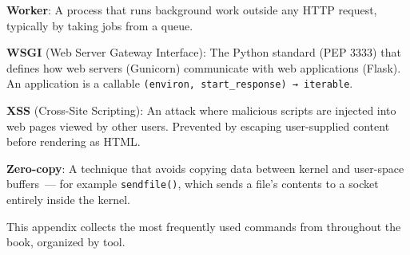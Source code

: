 \textbf{Worker}: A process that runs background work outside any HTTP request, typically by taking jobs from a queue.

\textbf{WSGI} (Web Server Gateway Interface): The Python standard (PEP 3333) that defines how web servers (Gunicorn) communicate with web applications (Flask). An application is a callable \texttt{(environ,}\allowbreak{}\texttt{\ start\_}\allowbreak{}\texttt{response)\ →\ iterable}.

\textbf{XSS} (Cross-Site Scripting): An attack where malicious scripts are injected into web pages viewed by other users. Prevented by escaping user-supplied content before rendering as HTML.

\textbf{Zero-copy}: A technique that avoids copying data between kernel and user-space buffers~--- for example \texttt{sendfile()}, which sends a file's contents to a socket entirely inside the kernel.

\label{ch:44-appendices-3}

\chapterrule

This appendix collects the most frequently used commands from throughout the book, organized by tool.

\label{44-appendices:c1-python-and-pip}

